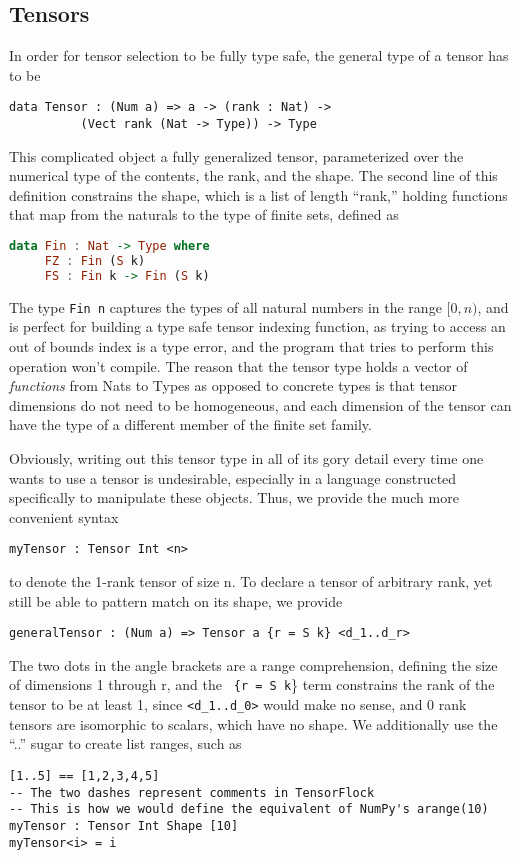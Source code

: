 \documentclass[12pt]{article}
\begin{document}
\subsection{Tensors}
In order for tensor selection to be fully type safe, the general type of a tensor has to be
\begin{lstlisting}
data Tensor : (Num a) => a -> (rank : Nat) -> 
	      (Vect rank (Nat -> Type)) -> Type
\end{lstlisting}
This complicated object a fully generalized tensor, parameterized over the numerical type of the contents, the rank, and the shape. The second line of this definition constrains the shape, which is a list of length ``rank,'' holding functions that map from the naturals to the type of finite sets, defined as 
\begin{lstlisting}[language=Haskell]
data Fin : Nat -> Type where
     FZ : Fin (S k)
     FS : Fin k -> Fin (S k)
\end{lstlisting}
The type \lstinline{Fin n}
captures the types of all natural numbers in the range $[0,n)$, and is perfect for building a type safe tensor indexing function, as trying to access an out of bounds index is a type error, and the program that tries to perform this operation won't compile. The reason that the tensor type holds a vector of \textit{functions} from Nats to Types as opposed to concrete types is that tensor dimensions do not need to be homogeneous, and each dimension of the tensor can have the type of a different member of the finite set family. 

Obviously, writing out this tensor type in all of its gory detail every time one wants to use a tensor is undesirable, especially in a language constructed specifically to manipulate these objects. Thus, we provide the much more convenient syntax 
\begin{lstlisting}
myTensor : Tensor Int <n>
\end{lstlisting}
to denote the 1-rank tensor of size n. To declare a tensor of arbitrary rank, yet still be able to pattern match on its shape, we provide
\begin{lstlisting}
generalTensor : (Num a) => Tensor a {r = S k} <d_1..d_r>
\end{lstlisting}
\pagebreak
The two dots in the angle brackets are a range comprehension, defining the size of dimensions 1 through r, and the \lstinline{ {r = S k}\} term constrains the rank of the tensor to be at least 1, since 
\lstinline{<d_1..d_0>} would make no sense, and 0 rank tensors are isomorphic to scalars, which have no shape. We additionally use the ``..'' sugar to create list ranges, such as 
\begin{lstlisting}
[1..5] == [1,2,3,4,5]
-- The two dashes represent comments in TensorFlock
-- This is how we would define the equivalent of NumPy's arange(10)
myTensor : Tensor Int Shape [10]
myTensor<i> = i 
\end{lstlisting}
\end{document}
